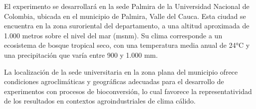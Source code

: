 \vspace{-0.5cm}
El experimento se desarrollará en la sede Palmira de la Universidad Nacional de Colombia, ubicada en el municipio de Palmira, Valle del Cauca. Esta ciudad se encuentra en la zona suroriental del departamento, a una altitud aproximada de 1.000 metros sobre el nivel del mar (msnm). Su clima corresponde a un ecosistema de bosque tropical seco, con una temperatura media anual de 24°C y una precipitación que varía entre 900 y 1.000 mm.

La localización de la sede universitaria en la zona plana del municipio ofrece condiciones agroclimáticas y geográficas adecuadas para el desarrollo de experimentos con procesos de bioconversión, lo cual favorece la representatividad de los resultados en contextos agroindustriales de clima cálido.

